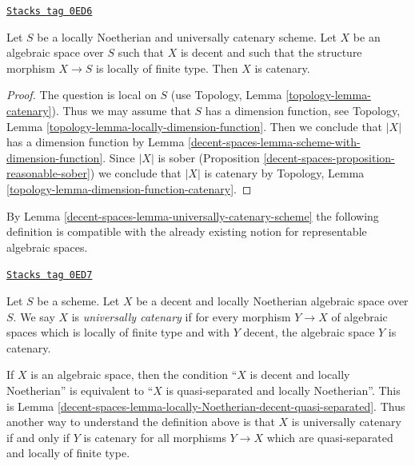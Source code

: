 \begin{lemma}
\label{decent-spaces-lemma-universally-catenary-scheme}
\href{https://stacks.math.columbia.edu/tag/0ED6}{\texttt{Stacks tag 0ED6}}

Let $S$ be a locally Noetherian and universally catenary scheme.
Let $X$ be an algebraic space over $S$ such that $X$ is decent
and such that the structure morphism $X \to S$ is locally of
finite type. Then $X$ is catenary.
\end{lemma}

\begin{proof}
The question is local on $S$ (use
Topology, Lemma \ref{topology-lemma-catenary}).
Thus we may assume that $S$ has a
dimension function, see Topology, Lemma
\ref{topology-lemma-locally-dimension-function}.
Then we conclude that $|X|$ has a dimension function by
Lemma \ref{decent-spaces-lemma-scheme-with-dimension-function}.
Since $|X|$ is sober (Proposition \ref{decent-spaces-proposition-reasonable-sober})
we conclude that $|X|$ is catenary by
Topology, Lemma \ref{topology-lemma-dimension-function-catenary}.
\end{proof}

By Lemma \ref{decent-spaces-lemma-universally-catenary-scheme}
the following definition is compatible with the
already existing notion for representable algebraic spaces.

\begin{definition}
\label{decent-spaces-definition-universally-catenary}
\href{https://stacks.math.columbia.edu/tag/0ED7}{\texttt{Stacks tag 0ED7}}

Let $S$ be a scheme. Let $X$ be a decent and locally Noetherian
algebraic space over $S$. We say $X$ is {\it universally catenary}
if for every morphism $Y \to X$ of algebraic spaces which is
locally of finite type and with $Y$ decent, the algebraic space
$Y$ is catenary.
\end{definition}

If $X$ is an algebraic space, then the condition
``$X$ is decent and locally Noetherian'' is equivalent to
``$X$ is quasi-separated and locally Noetherian''. This is
Lemma \ref{decent-spaces-lemma-locally-Noetherian-decent-quasi-separated}.
Thus another way to understand the definition above is that $X$
is universally catenary if and only if $Y$ is catenary for
all morphisms $Y \to X$ which are quasi-separated and locally of finite type.

